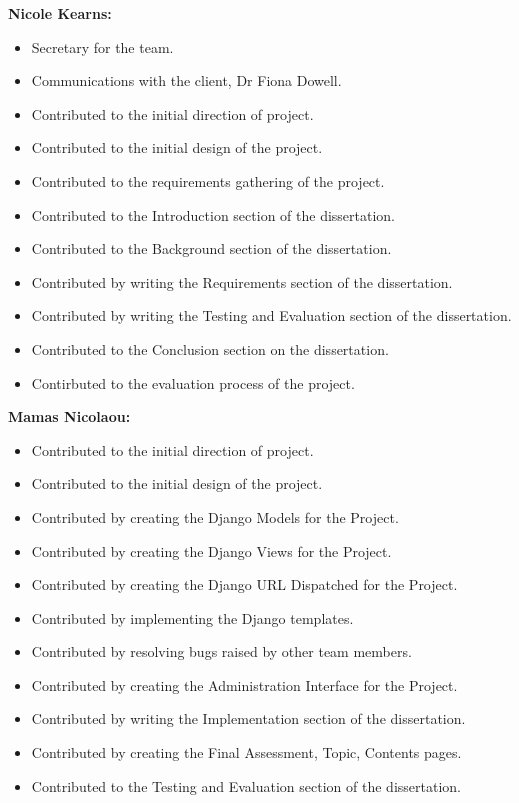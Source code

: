 \documentclass{l3proj}
\begin{document}
{\textbf{Nicole Kearns:}

\begin{itemize}
\item Secretary for the team.
\item Communications with the client, Dr Fiona Dowell.
\item Contributed to the initial direction of project.
\item Contributed to the initial design of the project.
\item Contributed to the requirements gathering of the project.
\item Contributed to the Introduction section of the dissertation.
\item Contributed to the Background section of the dissertation.
\item Contributed by writing the Requirements section of the dissertation.
\item Contributed by writing the Testing and Evaluation section of the dissertation.
\item Contributed to the Conclusion section on the dissertation.
\item Contirbuted to the evaluation process of the project.
\end{itemize}

\textbf{Mamas Nicolaou:}
\begin{itemize}
\item Contributed to the initial direction of project.
\item Contributed to the initial design of the project.
\item Contributed by creating the Django Models for the Project.
\item Contributed by creating the Django Views for the Project.
\item Contributed by creating the Django URL Dispatched for the Project.
\item Contributed by implementing the Django templates.
\item Contributed by resolving bugs raised by other team members.
\item Contributed by creating the Administration Interface for the Project.
\item Contributed by writing the Implementation section of the dissertation.
\item Contributed by creating the Final Assessment, Topic, Contents pages.
\item Contributed to the Testing and Evaluation section of the dissertation.
\end{itemize}

}
\end{document}
